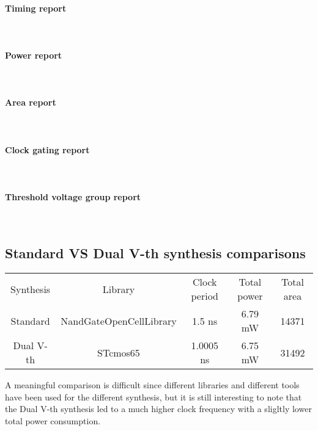 \paragraph{Timing report} \mbox{} \\

\paragraph{Power report} \mbox{} \\

\paragraph{Area report} \mbox{} \\

\paragraph{Clock gating report} \mbox{} \\

\paragraph{Threshold voltage group report} \mbox{} \\


\subsection{Standard VS Dual V-th synthesis comparisons}
\begin{table}[H]
	\centering
	\begin{tabular}{ccccc}
		\hline
		\rowcolor{gray!50}
		Synthesis & Library & Clock period & Total power & Total area \\
		Standard & NandGateOpenCellLibrary & 1.5 ns & 6.79 mW & 14371 \\
		\rowcolor{gray!25}
		Dual V-th & STcmos65 & 1.0005 ns & 6.75 mW & 31492 \\
		\hline
	\end{tabular}
	\label{tab:syn_cmp}
\end{table}

A meaningful comparison is difficult since different libraries and different
tools have been used for the different synthesis, but it is still interesting
to note that the Dual V-th synthesis led to a much higher clock frequency with
a sligltly lower total power consumption.


